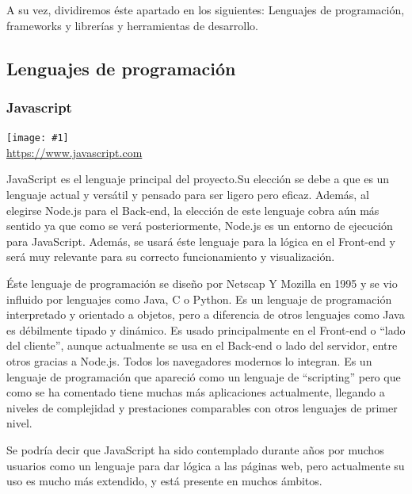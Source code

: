 \documentclass[11pt,openany]{book}
\newcommand{\logo}[2]{\medskip\begin{center}\texttt{[image: \#1]}\\\scriptsize\url{#2}\end{center}\bigskip}
\begin{document}
A su vez, dividiremos éste apartado en los siguientes: Lenguajes de programación, frameworks y librerías y herramientas de desarrollo.

\subsection{Lenguajes de programación}

\subsubsection{Javascript}

\logo{logos/javascript.jpg}{https://www.javascript.com}

JavaScript es el lenguaje principal del proyecto.Su elección se debe a que es un lenguaje actual y versátil y pensado para ser ligero pero eficaz. Además, al elegirse Node.js para el Back-end, la elección de este lenguaje cobra aún más sentido ya que como se verá posteriormente, Node.js es un entorno de ejecución para JavaScript. Además, se usará éste lenguaje para la lógica en el Front-end y será muy relevante para su correcto funcionamiento y visualización.

Éste lenguaje de programación se diseño por Netscap Y Mozilla en 1995 y se vio influido por lenguajes como Java, C o Python\cite{2}. Es un lenguaje de programación interpretado y orientado a objetos, pero a diferencia de otros lenguajes como Java es débilmente tipado y dinámico. Es usado principalmente en el Front-end o ``lado del cliente'', aunque actualmente se usa en el Back-end o lado del servidor, entre otros gracias a Node.js. Todos los navegadores modernos lo integran. Es un lenguaje de programación que apareció como un lenguaje de ``scripting'' pero que como se ha comentado tiene muchas más aplicaciones actualmente, llegando a niveles de complejidad y prestaciones comparables con otros lenguajes de primer nivel.

Se podría decir que JavaScript ha sido contemplado durante años por muchos usuarios como un lenguaje para dar lógica a las páginas web, pero actualmente su uso es mucho más extendido, y está presente en muchos ámbitos. 

\end{document}
